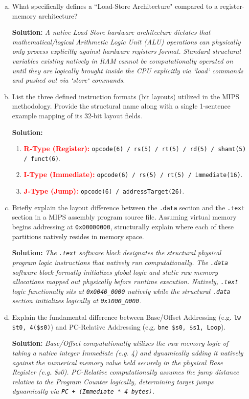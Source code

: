 \documentclass[letterpaper]{report}
\begin{document}
\begin{enumerate}[(a)]
    \item What specifically defines a ``Load-Store Architecture" compared to a register-memory architecture?
    
    {\color{red} \textbf{Solution:} \textit{A native Load-Store hardware architecture dictates that mathematical/logical Arithmetic Logic Unit (ALU) operations can physically only process explicitly against hardware registers format. Standard structural variables existing natively in RAM cannot be computationally operated on until they are logically brought inside the CPU explicitly via `load` commands and pushed out via `store` commands.}}

    \item List the three defined instruction formats (bit layouts) utilized in the MIPS methodology. Provide the structural name along with a single 1-sentence example mapping of its 32-bit layout fields.
    
    {\color{red} \textbf{Solution:} 
    \begin{enumerate}
        \item \textcolor{red}{\textbf{R-Type (Register):}} \texttt{opcode(6) / rs(5) / rt(5) / rd(5) / shamt(5) / funct(6)}.
        \item \textcolor{red}{\textbf{I-Type (Immediate):}} \texttt{opcode(6) / rs(5) / rt(5) / immediate(16)}.
        \item \textcolor{red}{\textbf{J-Type (Jump):}} \texttt{opcode(6) / addressTarget(26)}.
    \end{enumerate}}

    \item Briefly explain the layout difference between the \texttt{.data} section and the \texttt{.text} section in a MIPS assembly program source file. Assuming virtual memory begins addressing at \texttt{0x00000000}, structurally explain where each of these partitions natively resides in memory space.
    
    {\color{red} \textbf{Solution:} \textit{The \texttt{.text} software block designates the structural physical program logic instructions that natively run computationally. The \texttt{.data} software block formally initializes global logic and static raw memory allocations mapped out physically before runtime execution. Natively, \texttt{.text} logic functionally sits at \texttt{0x0040\_0000} natively while the structural \texttt{.data} section initializes logically at \texttt{0x1000\_0000}.}}

    \item Explain the fundamental difference between Base/Offset Addressing (e.g. \texttt{lw \$t0, 4(\$s0)}) and PC-Relative Addressing (e.g. \texttt{bne \$s0, \$s1, Loop}).
    
    {\color{red} \textbf{Solution:} \textit{Base/Offset computationally utilizes the raw memory logic of taking a native integer Immediate (e.g. 4) and dynamically adding it natively against the numerical memory value held securely in the physical Base Register (e.g. \$s0). PC-Relative computationally assumes the jump distance relative to the Program Counter logically, determining target jumps dynamically via \texttt{PC + (Immediate * 4 bytes)}.}}
\end{enumerate}
\end{document}

